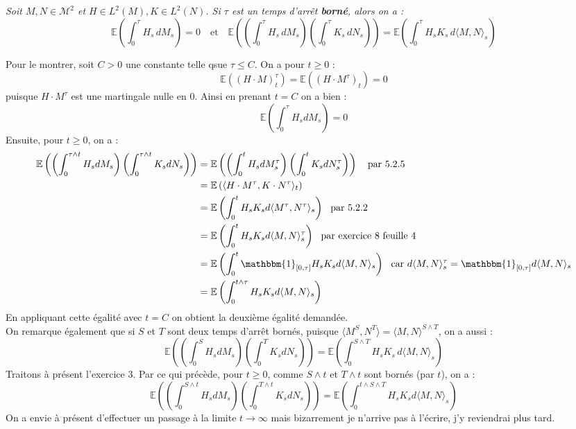 \documentclass[a4paper,12pt]{article}
\newcommand{\E}{\mathbb{E}}
\newcommand{\ind}{\mathbbm{1}}
\newcommand{\m}{\mathcal{M}}
\begin{document}
\textit{Soit $M,N \in \m^2$ et $H \in L^2(M), K \in L^2(N)$. Si $\tau$ est un temps d'arrêt \textbf{borné}, alors on a :
$$\E \left( \int_{0}^{\tau} H_s \, dM_s \right) = 0 \quad \text{et} \quad \E \left( \left( \int_0^{\tau} H_s \, dM_s \right) \left( \int_{0}^{\tau} K_s \, dN_s \right) \right) = \E \left( \int_0^{\tau} H_s K_s \, d \langle M,N \rangle_s \right)$$}

Pour le montrer, soit $C>0$ une constante telle qsue $\tau \leq C$. On a pour $t \geq 0$ :
$$\E ((H \cdot M)^{\tau}_t) = \E ((H \cdot M^{\tau})_{t}) = 0$$
puisque $H \cdot M^{\tau}$ est une martingale nulle en 0. Ainsi en prenant $t=C$ on a bien :
$$\E \left( \int_{0}^{\tau} H_s dM_s \right) = 0$$
Ensuite, pour $t \geq 0$, on a :
\begin{align*}
\E \left( \left( \int_{0}^{\tau \wedge t} H_s dM_s \right) \left( \int_{0}^{\tau \wedge t} K_s dN_s \right) \right) & = \E \left( \left( \int_{0}^t H_s dM^{\tau}_s \right) \left( \int_0^{t} K_s dN^{\tau}_s \right) \right) \ \ \text{ par 5.2.5} \\
& = \E \left( \langle H \cdot M^\tau, K \cdot N^{\tau} \rangle_t \right) \\
& = \E \left( \int_0^{t} H_s K_s d \langle M^{\tau}, N^{\tau} \rangle_s  \right) \ \ \text{par 5.2.2} \\
& = \E \left( \int_0^{t} H_s K_s d \langle M, N \rangle^{\tau}_s  \right) \ \ \text{par exercice 8 feuille 4} \\
& = \E \left( \int_{0}^{t} \ind_{[0,\tau]} H_s K_s d \langle M,N \rangle_s \right) \ \ \text{car } d \langle M,N \rangle^{\tau}_s = \ind_{[0,\tau]} d \langle M,N \rangle_s \\
& = \E \left( \int_{0}^{t \wedge \tau} H_s K_s d \langle M,N \rangle_s \right)
\end{align*}
En appliquant cette égalité avec $t=C$ on obtient la deuxième égalité demandée. \\

On remarque également que si $S$ et $T$ sont deux temps d'arrêt bornés, puisque $\langle M^S, N^T \rangle = \langle M,N \rangle^{S \wedge T}$, on a aussi :
$$\E \left( \left( \int_0^{S} H_s dM_s \right) \left( \int_{0}^{T} K_s dN_s \right) \right) = \E \left( \int_0^{S \wedge T} H_s K_s \, d \langle M,N \rangle_s \right)$$
Traitons à présent l'exercice 3. Par ce qui précède, pour $t \geq 0$, comme $S \wedge t$ et $T \wedge t$ sont bornés (par $t$), on a :
$$\E \left( \left( \int_0^{S \wedge t} H_s dM_s \right) \left( \int_0^{T \wedge t} K_s dN_s \right) \right) = \E \left( \int_{0}^{t \wedge S \wedge T} H_s K_s d \langle M,N \rangle_s \right)$$
On a envie à présent d'effectuer un passage à la limite $t\rightarrow \infty$ mais bizarrement je n'arrive pas à l'écrire, j'y reviendrai plus tard.
\end{document}
